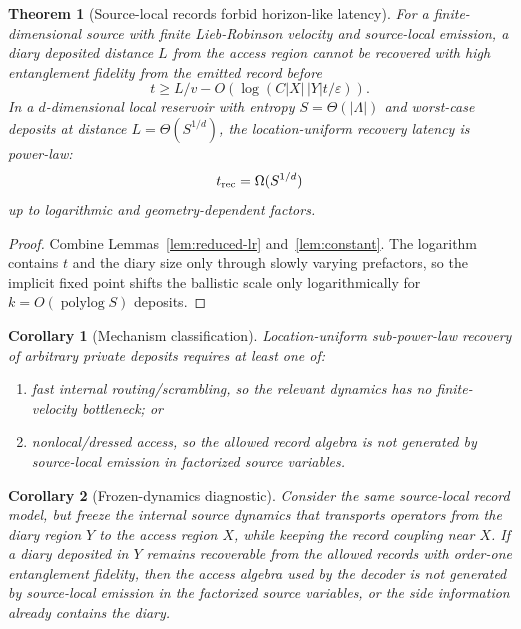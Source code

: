 \documentclass[11pt]{article}
\newtheorem{theorem}{Theorem}
\newtheorem{corollary}{Corollary}
\begin{document}
\begin{theorem}[Source-local records forbid horizon-like latency]
\label{thm:latency}
For a finite-dimensional source with finite Lieb-Robinson velocity and
source-local emission, a diary deposited distance $L$ from the access
region cannot be recovered with high entanglement fidelity from the
emitted record before
\begin{equation}
  t \ge L/v - O(\log(C|X|\,|Y|t/\varepsilon)).
\end{equation}
In a $d$-dimensional local reservoir with entropy $S=\Theta(|\Lambda|)$
and worst-case deposits at distance $L=\Theta(S^{1/d})$, the
location-uniform recovery latency is power-law:
\begin{equation}
  t_{\rm rec}=\Omega(S^{1/d})
\end{equation}
up to logarithmic and geometry-dependent factors.
\end{theorem}

\begin{proof}
Combine Lemmas~\ref{lem:reduced-lr} and~\ref{lem:constant}.  The
logarithm contains $t$ and the diary size only through slowly varying
prefactors, so the implicit fixed point shifts the ballistic scale only
logarithmically for $k=O(\operatorname{polylog}S)$ deposits.
\end{proof}

\begin{corollary}[Mechanism classification]
Location-uniform sub-power-law recovery of arbitrary private deposits
requires at least one of:
\begin{enumerate}
  \item fast internal routing/scrambling, so the relevant dynamics has no
  finite-velocity bottleneck; or
  \item nonlocal/dressed access, so the allowed record algebra is not
  generated by source-local emission in factorized source variables.
\end{enumerate}
\end{corollary}

\begin{corollary}[Frozen-dynamics diagnostic]
\label{cor:frozen}
Consider the same source-local record model, but freeze the internal
source dynamics that transports operators from the diary region $Y$ to
the access region $X$, while keeping the record coupling near $X$.  If a
diary deposited in $Y$ remains recoverable from the allowed records with
order-one entanglement fidelity, then the access algebra used by the
decoder is not generated by source-local emission in the factorized
source variables, or the side information already contains the diary.
\end{corollary}
\end{document}
